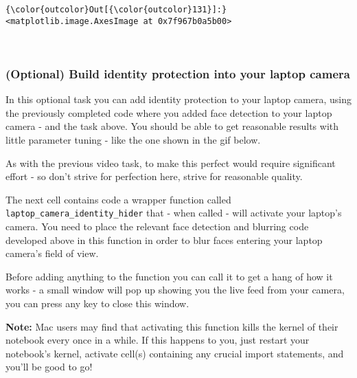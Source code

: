 \documentclass[11pt]{article}
\begin{document}
\begin{Verbatim}[commandchars=\\\{\}]
{\color{outcolor}Out[{\color{outcolor}131}]:} <matplotlib.image.AxesImage at 0x7f967b0a5b00>
\end{Verbatim}
            
    \begin{center}
    \end{center}
    { \hspace*{\fill} \\}
    
    \hypertarget{optional-build-identity-protection-into-your-laptop-camera}{%
\subsubsection{(Optional) Build identity protection into your laptop
camera}\label{optional-build-identity-protection-into-your-laptop-camera}}

In this optional task you can add identity protection to your laptop
camera, using the previously completed code where you added face
detection to your laptop camera - and the task above. You should be able
to get reasonable results with little parameter tuning - like the one
shown in the gif below.

As with the previous video task, to make this perfect would require
significant effort - so don't strive for perfection here, strive for
reasonable quality.

The next cell contains code a wrapper function called
\texttt{laptop\_camera\_identity\_hider} that - when called - will
activate your laptop's camera. You need to place the relevant face
detection and blurring code developed above in this function in order to
blur faces entering your laptop camera's field of view.

Before adding anything to the function you can call it to get a hang of
how it works - a small window will pop up showing you the live feed from
your camera, you can press any key to close this window.

\textbf{Note:} Mac users may find that activating this function kills
the kernel of their notebook every once in a while. If this happens to
you, just restart your notebook's kernel, activate cell(s) containing
any crucial import statements, and you'll be good to go!
\end{document}
